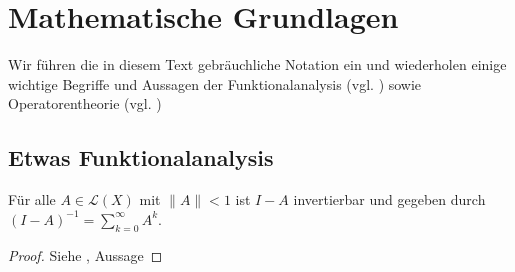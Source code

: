 





\chapter{Mathematische Grundlagen}

\par
Wir führen die in diesem Text gebräuchliche Notation ein und wiederholen einige wichtige Begriffe und Aussagen der Funktionalanalysis (vgl. \cite{})  sowie Operatorentheorie (vgl. \cite{engel_nagel_2006})


\section{Etwas Funktionalanalysis}

\cite{werner_2007}

\begin{fsatz}\label{Satz von der Neumann'schen Reihe}
Für alle $A\in \mathcal L(X)$ mit $\|A\| < 1$ ist $I-A$ invertierbar und gegeben durch $(I-A)^{-1}=\sum_{k=0}^\infty A^k$.
\end{fsatz}

\begin{proof}
Siehe \cite{}, Aussage 
\end{proof}




